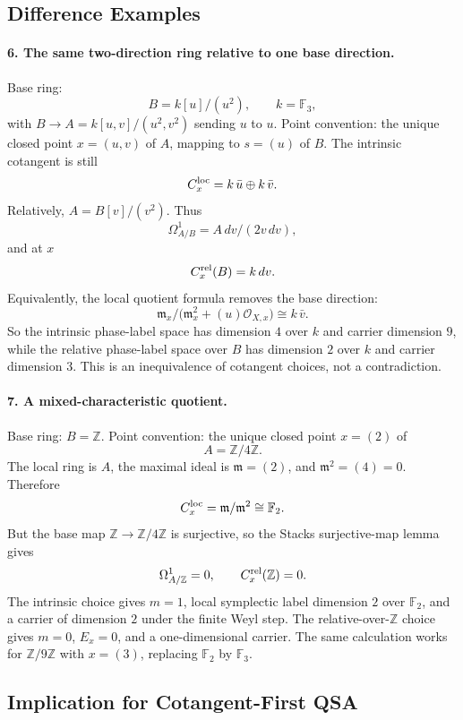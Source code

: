 \subsection{Difference Examples}

\paragraph{6. The same two-direction ring relative to one base direction.}
Base ring:
\[
  B=k[u]/(u^2),\qquad k=\mathbb F_3,
\]
with \(B\to A=k[u,v]/(u^2,v^2)\) sending \(u\) to \(u\).  Point convention:
the unique closed point \(x=(u,v)\) of \(A\), mapping to \(s=(u)\) of \(B\).
The intrinsic cotangent is still
\[
  C_x^{\rm loc}=k\,\bar u\oplus k\,\bar v .
\]
Relatively, \(A=B[v]/(v^2)\).  Thus
\[
  \Omega^1_{A/B}=A\,dv/(2v\,dv),
\]
and at \(x\)
\[
  C_x^{\rm rel}(B)=k\,dv .
\]
Equivalently, the local quotient formula removes the base direction:
\[
  \mathfrak m_x/
  \bigl(\mathfrak m_x^2+(u)\mathcal O_{X,x}\bigr)
  \cong k\,\bar v .
\]
So the intrinsic phase-label space has dimension \(4\) over \(k\) and carrier
dimension \(9\), while the relative phase-label space over \(B\) has dimension
\(2\) over \(k\) and carrier dimension \(3\).  This is an inequivalence of
cotangent choices, not a contradiction.

\paragraph{7. A mixed-characteristic quotient.}
Base ring: \(B=\mathbb Z\).  Point convention: the unique closed point
\(x=(2)\) of
\[
  A=\mathbb Z/4\mathbb Z.
\]
The local ring is \(A\), the maximal ideal is \(\mathfrak m=(2)\), and
\(\mathfrak m^2=(4)=0\).  Therefore
\[
  C_x^{\rm loc}=\mathfrak m/\mathfrak m^2\cong\mathbb F_2 .
\]
But the base map \(\mathbb Z\to\mathbb Z/4\mathbb Z\) is surjective, so the
Stacks surjective-map lemma gives
\[
  \Omega^1_{A/\mathbb Z}=0,\qquad C_x^{\rm rel}(\mathbb Z)=0.
\]
The intrinsic choice gives \(m=1\), local symplectic label dimension \(2\)
over \(\mathbb F_2\), and a carrier of dimension \(2\) under the finite Weyl
step.  The relative-over-\(\mathbb Z\) choice gives \(m=0\), \(E_x=0\), and a
one-dimensional carrier.  The same calculation works for
\(\mathbb Z/9\mathbb Z\) with \(x=(3)\), replacing \(\mathbb F_2\) by
\(\mathbb F_3\).

\subsection{Implication for Cotangent-First QSA}

